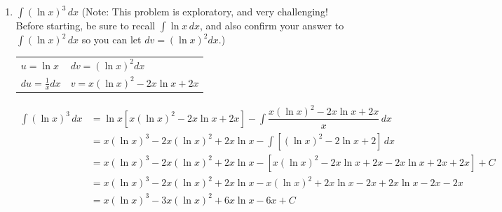 \documentclass{article}
\begin{document}
\begin{enumerate}
\begin{solution}
\begin{center}
    \begin{tabular}{ l l }
  $u=(\ln x)^2$ &  $dv = 1 dx$  \\
  $du=\frac{2\ln x}{x}dx$ &  $v=x$  \\
\end{tabular}
\begin{align*}
\displaystyle \int (\ln x)^2\,dx &= x(\ln x)^2 - \displaystyle 2 \int \ln x\,dx     
\end{align*}
\begin{tabular}{ l l }
  $u=\ln x$ &  $dv = 1 dx$  \\
  $du=\frac{1}{x}dx$ &  $v=x$  \\
\end{tabular}
\begin{align*}
   \displaystyle \int (\ln x)^2\,dx &= x(\ln x)^2 - \displaystyle 2\left [x \ln x - \displaystyle \int 1\,dx \right]\\
   &= x(\ln x)^2 - 2x \ln x +2x +C
\end{align*}
\end{center}    
\end{solution}
\pspace{\vfill}

\item $\displaystyle \int (\ln x)^3\,dx$ (Note: This problem is exploratory, and very challenging! Before starting, be sure to recall $\int \ln x \,dx$, and also confirm your answer to $\int (\ln x)^2 \,dx$ so you can let $dv=(\ln x)^2dx$.)

\begin{solution}
\begin{center}
\begin{tabular}{ l l }
  $u=\ln x$ &  $dv = (\ln x)^2 dx$  \\
  $du=\frac{1}{x}dx$ &  $v=x(\ln x)^2 - 2x \ln x +2x$  \\
\end{tabular}
\begin{align*}
\displaystyle \int (\ln x)^3\,dx&=\ln x \left[ x(\ln x)^2 - 2x \ln x +2x \right] - \displaystyle \int \dfrac{x(\ln x)^2 - 2x \ln x +2x}{x}\,dx \\ &=x(\ln x)^3-2x (\ln x)^2+2x\ln x - \displaystyle \int \left[ (\ln x)^2 - 2 \ln x +2 \right]\,dx \\ 
&= x(\ln x)^3-2x (\ln x)^2+2x\ln x - \left[x(\ln x)^2 - 2x \ln x +2x -2x\ln x +2x +2x\right]+C\\
&= x(\ln x)^3-2x (\ln x)^2+2x\ln x - x(\ln x)^2 +2x\ln x-2x + 2x\ln x-2x-2x 
\\ &= x(\ln x)^3-3x (\ln x)^2+6x\ln x-6x+C
\end{align*}
\end{center}

\end{solution}
\pspace{\vfill}
\end{enumerate}
\end{document}
